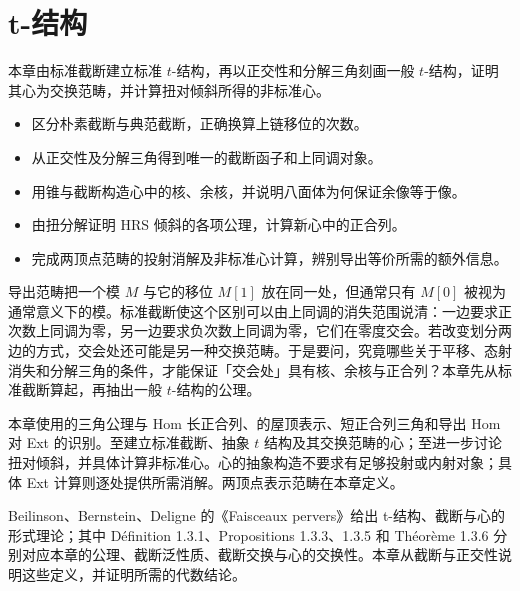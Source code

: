 
\chapter{t-结构}
\label{b4:ch:19}

\begin{chapterabstract}
	本章由标准截断建立标准 \(t\)-结构，再以正交性和分解三角刻画一般 \(t\)-结构，证明其心为交换范畴，并计算扭对倾斜所得的非标准心。
\end{chapterabstract}

\begin{learninggoals}
	\begin{itemize}
		\item 区分朴素截断与典范截断，正确换算上链移位的次数。
		\item 从正交性及分解三角得到唯一的截断函子和上同调对象。
		\item 用锥与截断构造心中的核、余核，并说明八面体为何保证余像等于像。
		\item 由扭分解证明 HRS 倾斜的各项公理，计算新心中的正合列。
		\item 完成两顶点范畴的投射消解及非标准心计算，辨别导出等价所需的额外信息。
	\end{itemize}
\end{learninggoals}

导出范畴把一个模 \(M\) 与它的移位 \(M[1]\) 放在同一处，但通常只有 \(M[0]\) 被视为通常意义下的模。标准截断使这个区别可以由上同调的消失范围说清：一边要求正次数上同调为零，另一边要求负次数上同调为零，它们在零度交会。若改变划分两边的方式，交会处还可能是另一种交换范畴。于是要问，究竟哪些关于平移、态射消失和分解三角的条件，才能保证「交会处」具有核、余核与正合列？本章先从标准截断算起，再抽出一般 \(t\)-结构的公理。

\ProseParagraphBreak
本章使用的三角公理与 Hom 长正合列、的屋顶表示、短正合列三角和导出 Hom 对 Ext 的识别。至建立标准截断、抽象 \(t\) 结构及其交换范畴的心；至进一步讨论扭对倾斜，并具体计算非标准心。心的抽象构造不要求有足够投射或内射对象；具体 Ext 计算则逐处提供所需消解。两顶点表示范畴在本章定义。

\ProseParagraphBreak
Beilinson、Bernstein、Deligne 的《Faisceaux pervers》\cite[§1.3, pp. 29--33]{BBD1982FaisceauxPervers}给出 t-结构、截断与心的形式理论；其中 Définition 1.3.1、Propositions 1.3.3、1.3.5 和 Théorème 1.3.6 分别对应本章的公理、截断泛性质、截断交换与心的交换性。本章从截断与正交性说明这些定义，并证明所需的代数结论。

